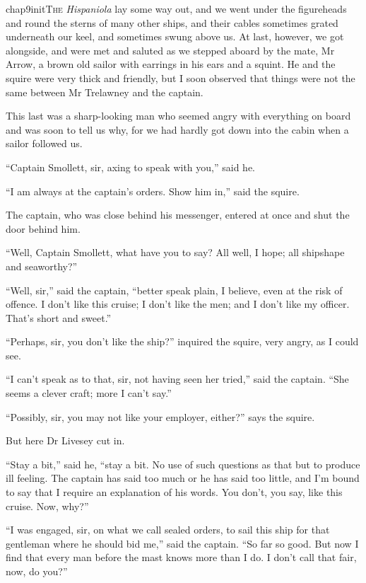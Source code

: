 
   \lettrine[lines=4,image=true]{chap9initT}{he} \textit{Hispaniola} lay some way out, and we went under the figureheads and round the sterns of many other ships, and their cables sometimes grated underneath our keel, and sometimes swung above us. At last, however, we got alongside, and were met and saluted as we stepped aboard by the mate, Mr Arrow, a brown old sailor with earrings in his ears and a squint. He and the squire were very thick and friendly, but I soon observed that things were not the same between Mr Trelawney and the captain.

This last was a sharp-looking man who seemed angry with everything on board and was soon to tell us why, for we had hardly got down into the cabin when a sailor followed us.

\enquote{Captain Smollett, sir, axing to speak with you,} said he.

\enquote{I am always at the captain’s orders. Show him in,} said the squire.

The captain, who was close behind his messenger, entered at once and shut the door behind him.

\enquote{Well, Captain Smollett, what have you to say? All well, I hope; all shipshape and seaworthy?}

\enquote{Well, sir,} said the captain, \enquote{better speak plain, I believe, even at the risk of offence. I don’t like this cruise; I don’t like the men; and I don’t like my officer. That’s short and sweet.}

\enquote{Perhaps, sir, you don’t like the ship?} inquired the squire, very angry, as I could see.

\enquote{I can’t speak as to that, sir, not having seen her tried,} said the captain. \enquote{She seems a clever craft; more I can’t say.}

\enquote{Possibly, sir, you may not like your employer, either?} says the squire.

But here Dr Livesey cut in.

\enquote{Stay a bit,} said he, \enquote{stay a bit. No use of such questions as that but to produce ill feeling. The captain has said too much or he has said too little, and I’m bound to say that I require an explanation of his words. You don’t, you say, like this cruise. Now, why?}

\enquote{I was engaged, sir, on what we call sealed orders, to sail this ship for that gentleman where he should bid me,} said the captain. \enquote{So far so good. But now I find that every man before the mast knows more than I do. I don’t call that fair, now, do you?}

